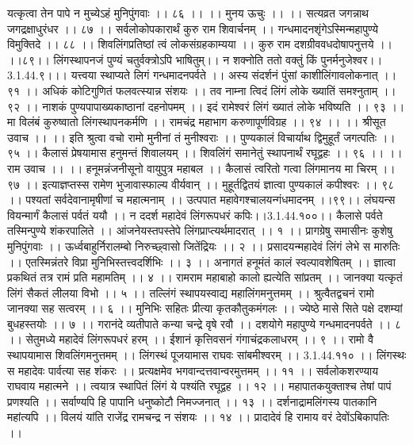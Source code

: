 यत्कृत्वा तेन पापे न मुच्येऽहं मुनिपुंगवाः ।। ८६ ।।
।। मुनय ऊचुः ।। ।।
सत्यव्रत जगन्नाथ जगद्रक्षाधुरंधर ।। ८७ ।।
सर्वलोकोपकारार्थं कुरु राम शिवार्चनम् ।।
गन्धमादनशृंगेऽस्मिन्महापुण्ये विमुक्तिदे ।। ८८ ।।
शिवलिंगप्रतिष्ठां त्वं लोकसंग्रहकाम्यया ।।
कुरु राम दशग्रीववधदोषापनुत्तये ।। ।।८९।।
लिंगस्थापनजं पुण्यं चतुर्वक्त्रोऽपि भाषितुम्।।
न शक्नोति ततो वक्तुं किं पुनर्मनुजेश्वर।।3.1.44.९।।।
यत्त्वया स्थाप्यते लिगं गन्धमादनपर्वते ।।
अस्य संदर्शनं पुंसां काशीलिंगावलोकनात् ।। ९१ ।।
अधिकं कोटिगुणितं फलवत्स्यान्न संशयः ।।
तव नाम्ना त्विदं लिंगं लोके ख्यातिं समश्नुताम् ।। ९२ ।।
नाशकं पुण्यपापाख्यकाष्ठानां दहनोपमम् ।।
इदं रामेश्वरं लिंगं ख्यातं लोके भविष्यति ।। ९३ ।।
मा विलंबं कुरुष्वातो लिंगस्थापनकर्मणि ।।
रामचंद्र महाभाग करुणापूर्णविग्रह ।। ९४ ।।
।। श्रीसूत उवाच ।। ।।
इति श्रुत्वा वचो रामो मुनीनां तं मुनीश्वराः ।।
पुण्यकालं विचार्याथ द्विमुहूर्तं जगत्पतिः ।। ९५ ।।
कैलासं प्रेषयामास हनुमन्तं शिवालयम् ।।
शिवलिंगं समानेतुं स्थापनार्थं रघूद्वहः ।। ९६ ।।
।। राम उवाच ।। ।।
हनूमन्नंजनीसूनो वायुपुत्र महाबल ।।
कैलासं त्वरितो गत्वा लिंगमानय मा चिरम् ।। ९७ ।।
इत्याज्ञप्तस्स रामेण भुजावास्फाल्य वीर्यवान् ।।
मुहूर्तद्वितयं ज्ञात्वा पुण्यकालं कपीश्वरः ।। ९८ ।।
पश्यतां सर्वदेवानामृषीणां च महात्मनाम् ।।
उत्पपात महावेगश्चालयन्गंधमादनम् ।।९९।।
लंघयन्स वियन्मार्गं कैलासं पर्वतं ययौ ।।
न ददर्श महादेवं लिंगरूपधरं कपिः।।3.1.44.१००।।
कैलासे पर्वते तस्मिन्पुण्ये शंकरपालिते ।।
आंजनेयस्तपस्तेपे लिंगप्राप्त्यर्थमादरात् ।। १ ।।
प्रागग्रेषु समासीनः कुशेषु मुनिपुंगवाः ।।
ऊर्ध्वबाहुर्निरालम्बो निरुच्छ्वासो जितेंद्रियः ।। २ ।।
प्रसादयन्महादेवं लिंगं लेभे स मारुतिः ।।
एतस्मिन्नंतरे विप्रा मुनिभिस्तत्त्वदर्शिभिः ।। ३ ।।
अनागतं हनूमंतं कालं स्वल्पावशेषितम् ।।
ज्ञात्वा प्रकथितं तत्र रामं प्रति महामतिम् ।। ४ ।।
रामराम महाबाहो कालो ह्यत्येति सांप्रतम् ।।
जानक्या यत्कृतं लिंगं सैकतं लीलया विभो ।। ५ ।।
तल्लिंगं स्थापयस्वाद्य महालिंगमनुत्तमम् ।।
श्रुत्वैतद्वचनं रामो जानक्या सह सत्वरम् ।। ६ ।।
मुनिभिः सहितः प्रीत्या कृतकौतुकमंगलः ।।
ज्येष्ठे मासे सिते पक्षे दशम्यां बुधहस्तयोः ।। ७ ।।
गरानंदे व्यतीपाते कन्या चन्द्रे वृषे रवौ ।।
दशयोगे महापुण्ये गन्धमादनपर्वते ।। ८ ।।
सेतुमध्ये महादेवं लिंगरूपधरं हरम् ।।
ईशानं कृत्तिवसनं गंगाचंद्रकलाधरम् ।। ९ ।।
रामो वै स्थापयामास शिवलिंगमनुत्तमम् ।।
लिंगस्थं पूजयामास राघवः सांबमीश्वरम् ।। 3.1.44.११० ।।
लिंगस्थः स महादेवः पार्वत्या सह शंकरः ।।
प्रत्यक्षमेव भगवान्दत्तवान्वरमुत्तमम् ।। ११ ।।
सर्वलोकशरण्याय राघवाय महात्मने ।।
त्वयात्र स्थापितं लिंगं ये पश्यंति रघूद्वह ।। १२ ।।
महापातकयुक्ताश्च तेषां पापं प्रणश्यति ।।
सर्वाण्यपि हि पापानि धनुष्कोटौ निमज्जनात् ।। १३ ।।
दर्शनाद्रामलिंगस्य पातकानि महांत्यपि ।।
विलयं यांति राजेंद्र रामचन्द्र न संशयः ।। १४ ।।
प्रादादेवं हि रामाय वरं देवोंऽबिकापतिः ।।
